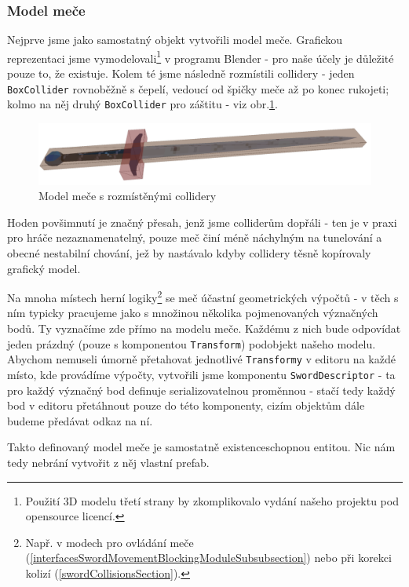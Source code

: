 \subsubsection*{Model meče}

Nejprve jsme jako samostatný objekt vytvořili model meče. Grafickou reprezentaci jsme vymodelovali\footnote{Použití 3D modelu třetí strany by zkomplikovalo vydání našeho projektu pod opensource licencí.} v programu Blender \cite{Blender} - pro naše účely je důležité pouze to, že existuje. Kolem té jsme následně rozmístili collidery - jeden \texttt{BoxCollider} rovnoběžně s čepelí, vedoucí od špičky meče až po konec rukojeti; kolmo na něj druhý \texttt{BoxCollider} pro záštitu - viz obr.\ref{obr05:swordWithColliders}. 
\begin{figure}[ht]\centering
  \center
  \includegraphics[width=120mm]{../img/swordWithColliders.png}
  \caption{Model meče s rozmístěnými collidery}
  \label{obr05:swordWithColliders}
\end{figure} 
Hoden povšimnutí je značný přesah, jenž jsme colliderům dopřáli - ten je v praxi pro hráče nezaznamenatelný, pouze meč činí méně náchylným na tunelování a obecné nestabilní chování, jež by nastávalo kdyby collidery těsně kopírovaly grafický model.  

Na mnoha místech herní logiky\footnote{Např. v modech pro ovládání meče (\ref{interfacesSwordMovementBlockingModuleSubsubsection}) nebo při korekci kolizí (\ref{swordCollisionsSection}).} se meč účastní geometrických výpočtů - v těch s ním typicky pracujeme jako s množinou několika pojmenovaných význačných bodů. Ty vyznačíme zde přímo na modelu meče. Každému z nich bude odpovídat jeden prázdný (pouze s komponentou \texttt{Transform}) podobjekt našeho modelu. Abychom nemuseli úmorně přetahovat jednotlivé \texttt{Transformy} v editoru na každé místo, kde provádíme výpočty, vytvořili jsme komponentu \texttt{SwordDescriptor} - ta pro každý význačný bod definuje serializovatelnou proměnnou - stačí tedy každý bod v editoru přetáhnout pouze do této komponenty, cizím objektům dále budeme předávat odkaz na ní.

\bigbreak

Takto definovaný model meče je samostatně existenceschopnou entitou. Nic nám tedy nebrání vytvořit z něj vlastní prefab.

